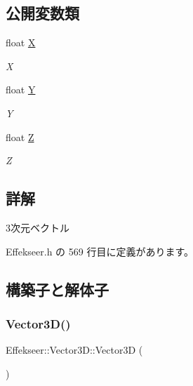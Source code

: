 \subsection*{公開変数類}
\begin{DoxyCompactItemize}
\item 
float \mbox{\hyperlink{struct_effekseer_1_1_vector3_d_a72ca019b959303fd6b5a685634a5ab24}{X}}
\begin{DoxyCompactList}\small\item\em X \end{DoxyCompactList}\item 
float \mbox{\hyperlink{struct_effekseer_1_1_vector3_d_a93a6252ad3d33b83eac5f088ed51c114}{Y}}
\begin{DoxyCompactList}\small\item\em Y \end{DoxyCompactList}\item 
float \mbox{\hyperlink{struct_effekseer_1_1_vector3_d_aa73821e922d235f82cfb3d8eab43901a}{Z}}
\begin{DoxyCompactList}\small\item\em Z \end{DoxyCompactList}\end{DoxyCompactItemize}


\subsection{詳解}
3次元ベクトル 

 Effekseer.\+h の 569 行目に定義があります。



\subsection{構築子と解体子}
\mbox{\label{struct_effekseer_1_1_vector3_d_abf224ea54e943e49876d5d5843693661}} 
\subsubsection{\texorpdfstring{Vector3\+D()}{Vector3D()}\hspace{0.1cm}{\footnotesize\ttfamily [1/2]}}
{\footnotesize\ttfamily Effekseer\+::\+Vector3\+D\+::\+Vector3D (\begin{DoxyParamCaption}{ }\end{DoxyParamCaption})}



